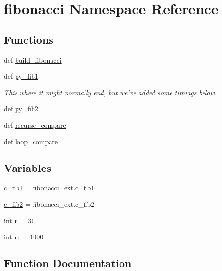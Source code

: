 \hypertarget{namespacefibonacci}{}\section{fibonacci Namespace Reference}
\label{namespacefibonacci}
\subsection*{Functions}
\begin{DoxyCompactItemize}
\item 
def \hyperlink{namespacefibonacci_a71e5921b3e56f42eca1269ba2f9845a2}{build\+\_\+fibonacci}
\item 
def \hyperlink{namespacefibonacci_a04d81862f123fca2bba902b7c9b80034}{py\+\_\+fib1}
\begin{DoxyCompactList}\small\item\em This where it might normally end, but we've added some timings below. \end{DoxyCompactList}\item 
def \hyperlink{namespacefibonacci_af521d68bde19c69e3705dc2905b141e6}{py\+\_\+fib2}
\item 
def \hyperlink{namespacefibonacci_aac64fd81c6bf623904e9412b94b50079}{recurse\+\_\+compare}
\item 
def \hyperlink{namespacefibonacci_a47773e594f3aafcc3677d4b1bd0d5245}{loop\+\_\+compare}
\end{DoxyCompactItemize}
\subsection*{Variables}
\begin{DoxyCompactItemize}
\item 
\hyperlink{namespacefibonacci_a11fc886ca6c11277580ac59b2338e76f}{c\+\_\+fib1} = fibonacci\+\_\+ext.\+c\+\_\+fib1
\item 
\hyperlink{namespacefibonacci_a551f555a8becdb528ec9df2e2206a8d8}{c\+\_\+fib2} = fibonacci\+\_\+ext.\+c\+\_\+fib2
\item 
int \hyperlink{namespacefibonacci_a93e79c423fe8f8612997e4d943f006cf}{n} = 30
\item 
int \hyperlink{namespacefibonacci_ae372d83b40e87479b50e233b552e8db2}{m} = 1000
\end{DoxyCompactItemize}


\subsection{Function Documentation}
\hypertarget{namespacefibonacci_a71e5921b3e56f42eca1269ba2f9845a2}{}
